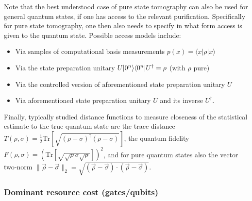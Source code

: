 \begin{refsection}
Note that the best understood case of pure state tomography can also be used for general quantum states, if one has access to the relevant purification. Specifically for pure state tomography, one then also needs to specify in what form access is given to the quantum state. Possible access models include:
\begin{itemize}
    \item Via samples of computational basis measurements $p(x) = \langle x |\rho|x \rangle$
    \item Via the state preparation unitary $U\lvert0^n\rangle\langle0^n\rvert U^\dagger  = \rho$ (with $\rho$ pure)
    \item Via the controlled version of aforementioned state preparation unitary $U$
    \item Via aforementioned state preparation unitary $U$ and its inverse $U^\dagger$.
\end{itemize}
Finally, typically studied distance functions to measure closeness of the statistical estimate to the true quantum state are the trace distance $T(\rho,\sigma)=\frac{1}{2}\mathrm{Tr}\left[\sqrt{(\rho-\sigma)^\dagger(\rho-\sigma)}\right]$, the quantum fidelity $F(\rho,\sigma)=\left(\mathrm{Tr}\left[\sqrt{\sqrt{\rho}\sigma\sqrt{\rho}}\right]\right)^2$, and for pure quantum states also the vector two-norm $\|\vec{\rho}-\vec{\sigma}\|_2=\sqrt{(\vec{\rho}-\vec{\sigma})\cdot(\vec{\rho}-\vec{\sigma})}$.


\subsubsection*{Dominant resource cost (gates/qubits)}


\end{refsection}
